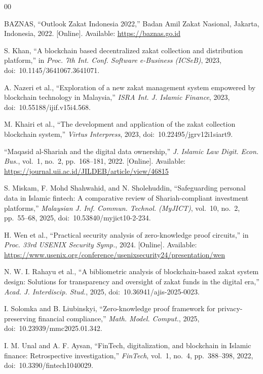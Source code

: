 \documentclass[conference]{IEEEtran}
\begin{document}
\begin{thebibliography}{00}

BAZNAS, ``Outlook Zakat Indonesia 2022,'' Badan Amil Zakat Nasional, Jakarta, Indonesia, 2022. [Online]. Available: \url{https://baznas.go.id}

S. Khan, ``A blockchain based decentralized zakat collection and distribution platform,'' in \textit{Proc. 7th Int. Conf. Software e-Business (ICSeB)}, 2023, doi:~10.1145/3641067.3641071.

A. Nazeri et al., ``Exploration of a new zakat management system empowered by blockchain technology in Malaysia,'' \textit{ISRA Int. J. Islamic Finance}, 2023, doi:~10.55188/ijif.v15i4.568.

M. Khairi et al., ``The development and application of the zakat collection blockchain system,'' \textit{Virtus Interpress}, 2023, doi:~10.22495/jgrv12i1siart9.

``Maqasid al-Shariah and the digital data ownership,'' \textit{J. Islamic Law Digit. Econ. Bus.}, vol.~1, no.~2, pp.~168--181, 2022. [Online]. Available: \url{https://journal.uii.ac.id/JILDEB/article/view/46815}

S. Miskam, F. Mohd Shahwahid, and N. Sholehuddin, ``Safeguarding personal data in Islamic fintech: A comparative review of Shariah-compliant investment platforms,'' \textit{Malaysian J. Inf. Commun. Technol. (MyJICT)}, vol.~10, no.~2, pp.~55--68, 2025, doi:~10.53840/myjict10-2-234.

H. Wen et al., ``Practical security analysis of zero-knowledge proof circuits,'' in \textit{Proc. 33rd USENIX Security Symp.}, 2024. [Online]. Available: \url{https://www.usenix.org/conference/usenixsecurity24/presentation/wen}

N. W. I. Rahayu et al., ``A bibliometric analysis of blockchain-based zakat system design: Solutions for transparency and oversight of zakat funds in the digital era,'' \textit{Acad. J. Interdiscip. Stud.}, 2025, doi:~10.36941/ajis-2025-0023.

I. Solomka and B. Liubinskyi, ``Zero-knowledge proof framework for privacy-preserving financial compliance,'' \textit{Math. Model. Comput.}, 2025, doi:~10.23939/mmc2025.01.342.

I. M. Unal and A. F. Aysan, ``FinTech, digitalization, and blockchain in Islamic finance: Retrospective investigation,'' \textit{FinTech}, vol.~1, no.~4, pp.~388--398, 2022, doi:~10.3390/fintech1040029.


\end{thebibliography}
\end{document}
